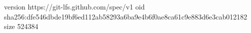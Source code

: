 version https://git-lfs.github.com/spec/v1
oid sha256:dfe546dbde19bf6ed112ab58293a6ba9e4b6f0ae8ca61c9e883d6e3cab012182
size 524384
